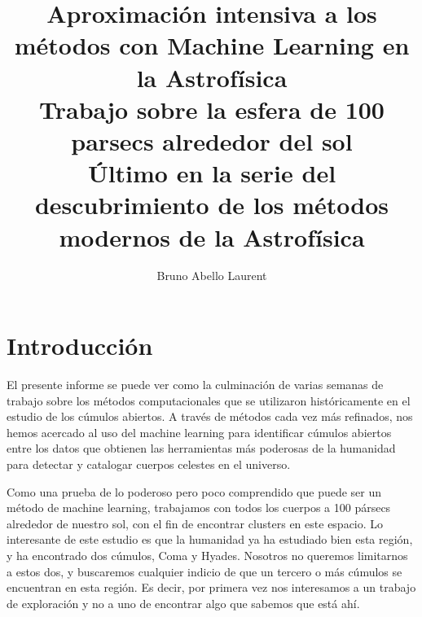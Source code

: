\documentclass[10pt,twocolumn]{article}
\title{\textbf{Aproximación intensiva a los métodos con Machine Learning en la Astrofísica}\\Trabajo sobre la esfera de 100 parsecs alrededor del sol\\Último en la serie del descubrimiento de los métodos modernos de la Astrofísica}
\author[1]{Bruno Abello Laurent}
\affil[1]{Universidad de Los Andes, Departamento de Física, Colombia}
\date{}
\begin{document}


\section{Introducción}

El presente informe se puede ver como la culminación de varias semanas de trabajo sobre los métodos computacionales
que se utilizaron históricamente en el estudio de los cúmulos abiertos. A través de métodos cada vez más refinados, 
nos hemos acercado al uso del machine learning para identificar cúmulos abiertos entre los datos que obtienen 
las herramientas más poderosas de la humanidad para detectar y catalogar cuerpos celestes en el universo. 

Como una prueba de lo poderoso pero poco comprendido que puede ser un método de machine learning, trabajamos
con todos los cuerpos a 100 pársecs alrededor de nuestro sol, con el fin de encontrar clusters en este espacio.
Lo interesante de este estudio es que la humanidad ya ha estudiado bien esta región, y ha encontrado dos 
cúmulos, Coma y Hyades. Nosotros no queremos limitarnos a estos dos, y buscaremos cualquier indicio de que 
un tercero o más cúmulos se encuentran en esta región. Es decir, por primera vez nos interesamos a un 
trabajo de exploración y no a uno de encontrar algo que sabemos que está ahí. 
\end{document}
